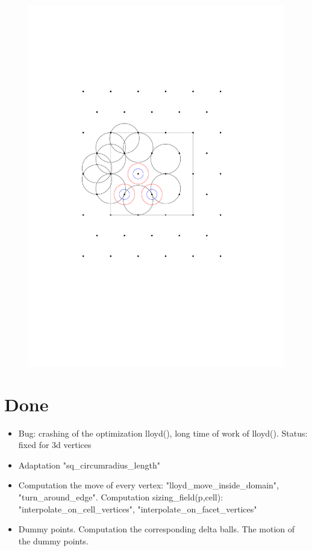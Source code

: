 \documentclass[a4paper,11pt]{article}
\begin{document}
\begin{figure}[h!]
\centerline{\includegraphics[scale=1]{fig/delta_balls.pdf}}
\caption{\label{}}
\end{figure}

\section{Done}

\begin{itemize}
\item

Bug: crashing of the optimization lloyd(), long time of work of lloyd().
Status: fixed for 3d vertices

\item

Adaptation "sq\_circumradius\_length"

\item

Computation the move of every vertex:
"lloyd\_move\_inside\_domain",
"turn\_around\_edge".
Computation sizing\_field(p,cell):
"interpolate\_on\_cell\_vertices",
"interpolate\_on\_facet\_vertices"

\item Dummy points. Computation the corresponding delta balls.
The motion of the dummy points.

\end{itemize}



\end{document}
